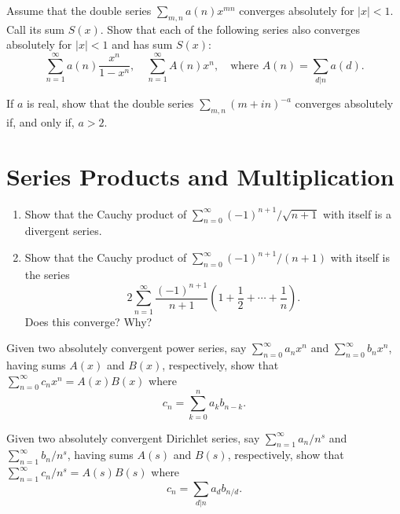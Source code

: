 \begin{problembox}
Assume that the double series \(\sum_{m,n} a(n)x^{mn}\) converges absolutely for \(|x| < 1\). Call its sum \(S(x)\). Show that each of the following series also converges absolutely for \(|x| < 1\) and has sum \(S(x)\):
\[\sum_{n=1}^{\infty} a(n) \frac{x^n}{1 - x^n}, \quad \sum_{n=1}^{\infty} A(n)x^n, \quad \text{where } A(n) = \sum_{d|n} a(d).\]
\end{problembox}

\begin{problembox}
If \(a\) is real, show that the double series \(\sum_{m,n} (m + i n)^{-a}\) converges absolutely if, and only if, \(a > 2\).
\end{problembox}

\section{Series Products and Multiplication}

\begin{problembox}
\begin{enumerate}[label=\alph*)]
\item Show that the Cauchy product of \(\sum_{n=0}^{\infty} (-1)^{n+1}/\sqrt{n + 1}\) with itself is a divergent series.
\item Show that the Cauchy product of \(\sum_{n=0}^{\infty} (-1)^{n+1}/(n + 1)\) with itself is the series
\[2 \sum_{n=1}^{\infty} \frac{(-1)^{n+1}}{n + 1} \left( 1 + \frac{1}{2} + \cdots + \frac{1}{n} \right).\]
Does this converge? Why?
\end{enumerate}
\end{problembox}

\begin{problembox}
Given two absolutely convergent power series, say \(\sum_{n=0}^{\infty} a_n x^n\) and \(\sum_{n=0}^{\infty} b_n x^n\), having sums \(A(x)\) and \(B(x)\), respectively, show that \(\sum_{n=0}^{\infty} c_n x^n = A(x) B(x)\) where
\[c_n = \sum_{k=0}^{n} a_k b_{n-k}.\]
\end{problembox}

\begin{problembox}
Given two absolutely convergent Dirichlet series, say \(\sum_{n=1}^{\infty} a_n / n^s\) and \(\sum_{n=1}^{\infty} b_n / n^s\), having sums \(A(s)\) and \(B(s)\), respectively, show that \(\sum_{n=1}^{\infty} c_n / n^s = A(s) B(s)\) where
\[c_n = \sum_{d|n} a_d b_{n/d}.\]
\end{problembox}

